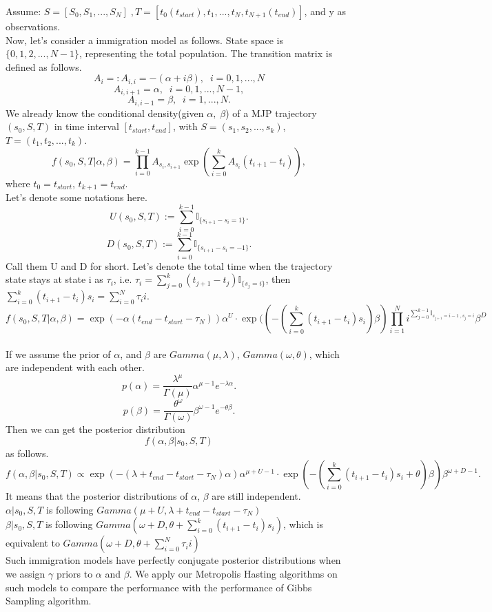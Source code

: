 \noindent Assume: $S = [S_0,S_1, ...,S_N] \;, T = [t_0(t_{start}), t_1,...,t_N, t_{N+1}(t_{end})]$, and y as observations.\\
Now, let's consider a immigration model as follows. State space is $\{0, 1, 2, ..., N - 1\}$, representing the total population. The transition matrix is defined as follows. 
$$A_i =: A_{i,i} = -(\alpha + i\beta), \; \; i =0,1,...,N$$ $$A_{i, i+1} = \alpha, \; \; i =0,1,...,N-1,$$ $$A_{i, i-1}  = \beta, \; \;  i =1,...,N.$$
We already know the conditional density(given $\alpha,\; \beta$) of a MJP trajectory $(s_0, S, T)$ in time interval $[t_{start}, t_{end}]$, with $S=(s_1, s_2,..., s_k)$, $T=(t_1, t_2,..., t_k)$. 
$$f(s_0,S,T| \alpha, \beta) = \prod_{i=0}^{k-1} A_{s_i, s_{i+1}} \exp(\sum_{i=0}^{k} A_{s_i}(t_{i+1} - t_{i})), $$
where $t_0 = t_{start}$, $t_{k+1} = t_{end}.$\\
Let's denote some notations here.\\
$$U(s_0, S, T):= \sum_{i=0}^{k-1} \mathbb{I}_{\{s_{i+1} - s_i = 1\}}.$$
$$D(s_0, S, T):= \sum_{i=0}^{k-1} \mathbb{I}_{\{s_{i+1} - s_i = -1\}}.$$
Call them U and D for short.
Let's denote the total time when the trajectory state stays at state i as $\tau_i$, i.e. $\tau_i = \sum_{j=0}^{k} (t_{j+1} -t_j)\mathbb{I}_{\{s_j = i\}}$, then $\sum_{i=0}^k (t_{i+1} - t_i)s_i = \sum_{i=0}^N \tau_ii.$\\

$$f(s_0,S,T| \alpha, \beta) = \exp(-\alpha(t_{end} - t_{start}- \tau_N) )\alpha^U \cdot  \exp((-(\sum_{i=0}^k (t_{i+1} - t_i)s_i)\beta) \prod_{i=1}^N i^{\sum_{j=0}^{k-1}\mathbb{I}_{s_{j+1} = i -1 \;,  s_j = i} }   \beta^D$$\\
If we assume the prior of $\alpha$, and $\beta$ are $Gamma(\mu,\lambda)$, $Gamma(\omega, \theta)$, which are independent with each other. \\
$$p(\alpha) = \frac{\lambda^\mu}{\Gamma(\mu)}\alpha^{\mu -1}e^{-\lambda \alpha}. $$
$$p(\beta) = \frac{\theta^\omega}{\Gamma(\omega)}\beta^{\omega -1}e^{-\theta \beta}. $$
Then we can get the posterior distribution $$f(\alpha, \beta | s_0,S,T)$$ as follows.
$$ f(\alpha, \beta | s_0,S,T) \propto \exp(-(\lambda + t_{end} - t_{start}- \tau_N)\alpha) \alpha^{\mu + U -1} \cdot \exp(-(\sum_{i=0}^k (t_{i+1} - t_i)s_i + \theta)\beta) \beta^{\omega+ D -1}.$$
It means that the posterior distributions of $\alpha$, $\beta$ are still independent. \\
$\alpha | s_0,S,T$ is following $Gamma(\mu+ U,\lambda + t_{end} - t_{start}- \tau_N)$\\
$\beta | s_0,S,T$ is following $Gamma(\omega+ D,\theta + \sum_{i=0}^k (t_{i+1} - t_i)s_i)$, which is equivalent to $Gamma(\omega+ D,\theta +\sum_{i=0}^N \tau_ii)$\\
Such immigration models have perfectly conjugate posterior distributions when we assign $\gamma$ priors to $\alpha$ and $\beta$. We apply our Metropolis Hasting algorithms on such models to compare the performance with the performance of Gibbs Sampling algorithm.
